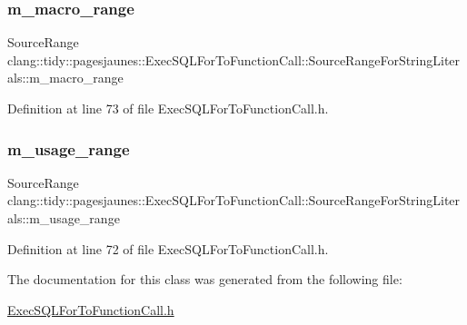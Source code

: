 \subsubsection{\texorpdfstring{m\+\_\+macro\+\_\+range}{m\_macro\_range}}
{\footnotesize\ttfamily Source\+Range clang\+::tidy\+::pagesjaunes\+::\+Exec\+S\+Q\+L\+For\+To\+Function\+Call\+::\+Source\+Range\+For\+String\+Literals\+::m\+\_\+macro\+\_\+range}



Definition at line 73 of file Exec\+S\+Q\+L\+For\+To\+Function\+Call.\+h.

\mbox{\label{classclang_1_1tidy_1_1pagesjaunes_1_1_exec_s_q_l_for_to_function_call_1_1_source_range_for_string_literals_a5db74b17e5bfe851c4589257b7dee62e}} 
\subsubsection{\texorpdfstring{m\+\_\+usage\+\_\+range}{m\_usage\_range}}
{\footnotesize\ttfamily Source\+Range clang\+::tidy\+::pagesjaunes\+::\+Exec\+S\+Q\+L\+For\+To\+Function\+Call\+::\+Source\+Range\+For\+String\+Literals\+::m\+\_\+usage\+\_\+range}



Definition at line 72 of file Exec\+S\+Q\+L\+For\+To\+Function\+Call.\+h.



The documentation for this class was generated from the following file\+:\begin{DoxyCompactItemize}
\item 
\hyperlink{_exec_s_q_l_for_to_function_call_8h}{Exec\+S\+Q\+L\+For\+To\+Function\+Call.\+h}\end{DoxyCompactItemize}
